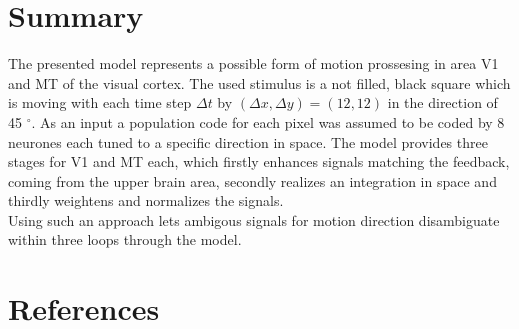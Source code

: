 \documentclass[a4paper]{article}
\begin{document}
\section{Summary}
The presented model represents a possible form of motion prossesing in area V1 and MT of the visual cortex. The used stimulus is a not filled, black square which is moving with each time step $\Delta t$ by $(\Delta x, \Delta y)=(12,12)$ in the direction of 45 $^{\circ}$. As an input a population code for each pixel was assumed to be coded by 8 neurones each tuned to a specific direction in space. The model provides three stages for V1 and MT each, which firstly enhances signals matching the feedback, coming from the upper brain area, secondly realizes an integration in space and thirdly weightens and normalizes the signals.\\
Using such an approach lets ambigous signals for motion direction disambiguate within three loops through the model.
\vspace{1cm}
\renewcommand*{\refname}{} 
\section{References}   
\vspace{-0.5cm} 
\printbibliography
\end{document}
